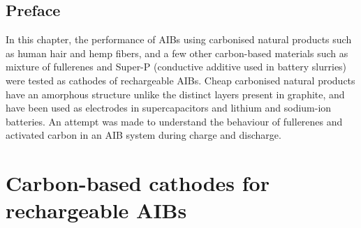 \section*{Preface}
In this chapter, the performance of AIBs using carbonised natural products such as human hair and hemp fibers, and a few other carbon-based materials such as mixture of fullerenes and Super-P (conductive additive used in battery slurries) were tested as cathodes of rechargeable AIBs. Cheap carbonised natural products have an amorphous structure unlike the distinct layers present in graphite, and have been used as electrodes in supercapacitors and lithium and sodium-ion batteries. An attempt was made to understand the behaviour of fullerenes and activated carbon in an AIB system during charge and discharge. 
\pagebreak
\chapter{Carbon-based cathodes for rechargeable AIBs} %

\label{chap5} %

